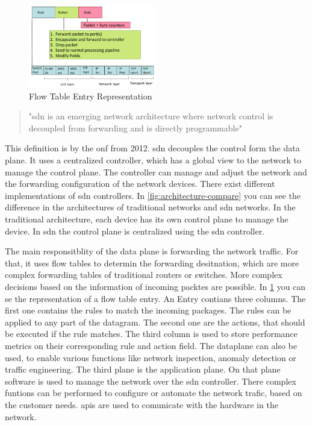 \documentclass[conference]{IEEEtran}
\begin{document}
	\begin{figure}
		\centering
		\includegraphics[width=0.5\textwidth]{figures/flow-table.png}
		\caption{Flow Table Entry Representation \cite{nunez2023briefoverviewsoftwaredefinednetworking}}
		\label{fig:flow-table}
	\end{figure}

	\begin{quote}
		"\acf{sdn} is an emerging network architecture
		where network control is decoupled from forwarding and is directly programmable" \cite{sdn-onf} 
	\end{quote}

	This definition is by the \ac{onf} from 2012. \acf{sdn} decouples the control form the data plane. It uses a centralized controller, which has a global view to the network to manage the control plane. The controller can manage and adjust the network and the forwarding configuration of the network devices. There exist different implementations of \ac{sdn} controllers. In \ref{fig:architecture-compare} you can see the difference in the architectures of traditional networks and \ac{sdn} networks. In the traditional architecture, each device has its own control plane to manage the device. In \ac{sdn} the control plane is centralized using the \ac{sdn} controller.

	The main responsitblity of the data plane is forwarding the network traffic. For that, it uses flow tables to determin the forwarding desitnation, which are more complex forwarding tables of traditional routers or switches. More complex decisions based on the information of incoming packtes are possible. In \ref{fig:flow-table} you can se the representation of a flow table entry. An Entry contians three columns. The first one contains the rules to match the incoming packages. The rules can be applied to any part of the datagram. The second one are the actions, that should be executed if the rule matches. The third column is used to store performance metrics on their corresponding rule and action field. \cite{nunez2023briefoverviewsoftwaredefinednetworking}
	The dataplane can also be used, to enable various functions like network inspection, anomaly detection or traffic engineering. \cite{MASOUDI20161} 
	The third plane is the application plane. On that plane software is used to manage the network over the \ac{sdn} controller. There complex funtions can be performed to configure or automate the network trafic, based on the customer needs. \acp{api} are used to comunicate with the hardware in the network.
\end{document}
